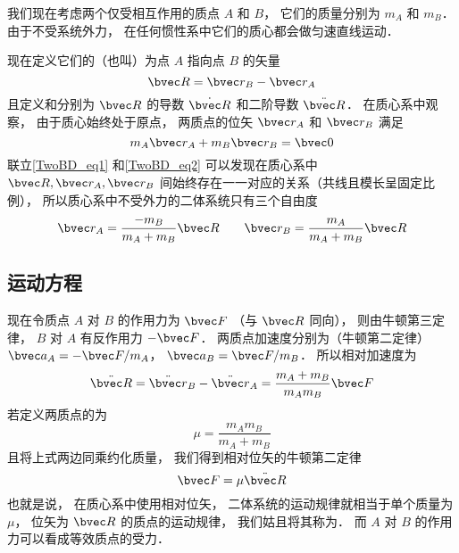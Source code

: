 

我们现在考虑两个仅受相互作用的质点 $A$ 和 $B$， 它们的质量分别为 $m_A$ 和 $m_B$． 由于不受系统外力， 在任何惯性系中它们的质心都会做匀速直线运动．%

现在定义它们的（也叫）为点 $A$ 指向点 $B$ 的矢量
\begin{equation}\label{TwoBD_eq1}
\bvec R = \bvec r_B - \bvec r_A
\end{equation}
且定义和分别为 $\bvec R$ 的导数 $\dot{\bvec R}$ 和二阶导数 $\ddot{\bvec R}$．
在质心系中观察， 由于质心始终处于原点， 两质点的位矢 $\bvec r_A$ 和 $\bvec r_B$ 满足
\begin{equation}\label{TwoBD_eq2}
m_A \bvec r_A + m_B \bvec r_B = \bvec 0
\end{equation}
联立\autoref{TwoBD_eq1} 和\autoref{TwoBD_eq2} 可以发现在质心系中 $\bvec R, \bvec r_A, \bvec r_B$ 间始终存在一一对应的关系（共线且模长呈固定比例）， 所以质心系中不受外力的二体系统只有三个自由度
\begin{equation}\label{TwoBD_eq3}
\bvec r_A = \frac{-m_B}{m_A + m_B} \bvec R \qquad \bvec r_B = \frac{m_A}{m_A + m_B} \bvec R
\end{equation}

\subsection{运动方程}

现在令质点 $A$ 对 $B$ 的作用力为 $\bvec F$ （与 $\bvec R$ 同向）， 则由牛顿第三定律， $B$ 对 $A$ 有反作用力 $- \bvec F$． 两质点加速度分别为（牛顿第二定律） $\bvec a_A =  -\bvec F/m_A$， $\bvec a_B =  \bvec F/m_B$． 所以相对加速度为
\begin{equation}
\ddot{\bvec R} = \ddot{\bvec r}_B - \ddot{\bvec r}_A = \frac{m_A+m_B}{m_Am_B} \bvec F
\end{equation}
若定义两质点的为
\begin{equation}
\mu = \frac{m_A m_B}{m_A + m_B}
\end{equation}
且将上式两边同乘约化质量， 我们得到相对位矢的牛顿第二定律
\begin{equation}\label{TwoBD_eq6}
\bvec F = \mu\ddot{\bvec R}
\end{equation}
也就是说， 在质心系中使用相对位矢， 二体系统的运动规律就相当于单个质量为 $\mu$， 位矢为 $\bvec R$ 的质点的运动规律， 我们姑且将其称为． 而 $A$ 对 $B$ 的作用力可以看成等效质点的受力．

